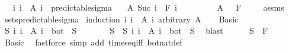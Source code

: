 \begin{isabellebody}
\ \ \ {\isachardoublequoteopen}{\isacharparenleft}{\kern0pt}{\isasymUnion}i{\isachardot}{\kern0pt}\ {\isacharbraceleft}{\kern0pt}i{\isacharbraceright}{\kern0pt}\ {\isasymtimes}\ A\ i{\isacharparenright}{\kern0pt}\ {\isasymin}\ predictable{\isacharunderscore}{\kern0pt}sigma{\isachardoublequoteclose}\isanewline
\ \ \ {\isachardoublequoteopen}A\ {\isacharparenleft}{\kern0pt}Suc\ i{\isacharparenright}{\kern0pt}\ {\isasymin}\ F\ i{\isachardoublequoteclose}\ \isanewline
\ \ \ \ \ \ \ \ {\isachardoublequoteopen}A\ {}\ {\isasymin}\ F\ {}{\isachardoublequoteclose}\isanewline
%
\isadelimproof
\ \ %
\endisadelimproof
%
\isatagproof
{}\isamarkupfalse%
\ assms\ \isamarkupfalse%
\ sets{\isacharunderscore}{\kern0pt}predictable{\isacharunderscore}{\kern0pt}sigma\isanewline
{}\isamarkupfalse%
\ {\isacharparenleft}{\kern0pt}induction\ {\isachardoublequoteopen}{\isacharparenleft}{\kern0pt}{\isasymUnion}i{\isachardot}{\kern0pt}\ {\isacharbraceleft}{\kern0pt}i{\isacharbraceright}{\kern0pt}\ {\isasymtimes}\ A\ i{\isacharparenright}{\kern0pt}{\isachardoublequoteclose}\ arbitrary{\isacharcolon}{\kern0pt}\ A{\isacharparenright}{\kern0pt}\isanewline
\ \ \isamarkupfalse%
\ Basic\isanewline
\ \ \isacommand{{\isacharbraceleft}{\kern0pt}}\isamarkupfalse%
\isanewline
\ \ \ \ \isamarkupfalse%
\ {\isachardoublequoteopen}{\isasymexists}S{\isachardot}{\kern0pt}\ {\isacharparenleft}{\kern0pt}{\isasymUnion}i{\isachardot}{\kern0pt}\ {\isacharbraceleft}{\kern0pt}i{\isacharbraceright}{\kern0pt}\ {\isasymtimes}\ A\ i{\isacharparenright}{\kern0pt}\ {\isacharequal}{\kern0pt}\ {\isacharbraceleft}{\kern0pt}bot{\isacharbraceright}{\kern0pt}\ {\isasymtimes}\ S{\isachardoublequoteclose}\isanewline
\ \ \ \ \isamarkupfalse%
\ \isamarkupfalse%
\ S\ \ S{\isacharcolon}{\kern0pt}\ {\isachardoublequoteopen}{\isacharparenleft}{\kern0pt}{\isasymUnion}i{\isachardot}{\kern0pt}\ {\isacharbraceleft}{\kern0pt}i{\isacharbraceright}{\kern0pt}\ {\isasymtimes}\ A\ i{\isacharparenright}{\kern0pt}\ {\isacharequal}{\kern0pt}\ {\isacharbraceleft}{\kern0pt}bot{\isacharbraceright}{\kern0pt}\ {\isasymtimes}\ S{\isachardoublequoteclose}\ \isamarkupfalse%
\ blast\isanewline
\ \ \ \ \isamarkupfalse%
\ {\isachardoublequoteopen}S\ {\isasymin}\ F\ {}{\isachardoublequoteclose}\ \isamarkupfalse%
\ Basic\ \isamarkupfalse%
\ {\isacharparenleft}{\kern0pt}fastforce\ simp\ add{\isacharcolon}{\kern0pt}\ times{\isacharunderscore}{\kern0pt}eq{\isacharunderscore}{\kern0pt}iff\ bot{\isacharunderscore}{\kern0pt}nat{\isacharunderscore}{\kern0pt}def{\isacharparenright}{\kern0pt}\isanewline

\end{isabellebody}
